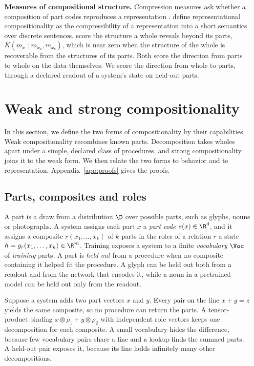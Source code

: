 \textbf{Measures of compositional structure.} Compression measures ask whether a composition of part codes reproduces a representation \citep{andreas2019}. \citet{elmoznino2024} define representational compositionality as the compressibility of a representation into a short semantics over discrete sentences. \citet{elmoznino2026} score the structure a whole reveals beyond its parts, $K(m_x \mid m_{x_a}, m_{x_b})$, which is near zero when the structure of the whole is recoverable from the structures of its parts. Both score the direction from parts to whole on the data themselves. We score the direction from whole to parts, through a declared readout of a system's state on held-out parts.

\section{Weak and strong compositionality}
\label{sec:definition}

In this section, we define the two forms of compositionality by their capabilities. Weak compositionality recombines known parts. Decomposition takes wholes apart under a simple, declared class of procedures, and strong compositionality joins it to the weak form. We then relate the two forms to behavior and to representation. Appendix~\ref{app:proofs} gives the proofs.

\subsection{Parts, composites and roles}
\label{sec:intuition}

A part is a draw from a distribution $\D$ over possible parts, such as glyphs, nouns or photographs. A system assigns each part $x$ a \emph{part code} $e(x) \in \R^d$, and it assigns a composite $r(x_1, \ldots, x_k)$ of $k$ parts in the roles of a relation $r$ a state $h = g_r(x_1, \ldots, x_k) \in \R^m$. Training exposes a system to a finite \emph{vocabulary} $\Voc$ of \emph{training} parts. A part is \emph{held out} from a procedure when no composite containing it helped fit the procedure. A glyph can be held out both from a readout and from the network that encodes it, while a noun in a pretrained model can be held out only from the readout.

Suppose a system adds two part vectors $x$ and $y$. Every pair on the line $x + y = z$ yields the same composite, so no procedure can return the parts. A tensor-product binding $x \otimes \rho_1 + y \otimes \rho_2$ with independent role vectors \citep{smolensky1990} keeps one decomposition for each composite. A small vocabulary hides the difference, because few vocabulary pairs share a line and a lookup finds the summed parts. A held-out pair exposes it, because its line holds infinitely many other decompositions.

